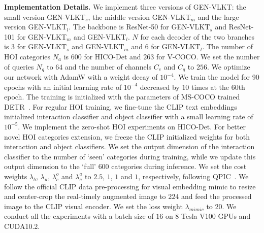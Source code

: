 \documentclass[10pt,twocolumn,letterpaper]{article}
\begin{document}
\noindent\textbf{Implementation Details.} We implement three versions of GEN-VLKT: the small version GEN-VLKT$_s$, the middle version GEN-VLKT$_m$ and the large version GEN-VLKT$_l$. The backbone is ResNet-50 for GEN-VLKT$_s$ and ResNet-101 for GEN-VLKT$_m$ and GEN-VLKT$_l$. $N$ for each decoder of the two branches is $3$ for GEN-VLKT$_s$ and GEN-VLKT$_m$ and $6$ for GEN-VLKT$_l$. The number of HOI categories $N_a$ is $600$ for HICO-Det and $263$ for V-COCO. We set the number of queries $N_q$ to $64$ and the number of channels $C_e$ and $C_q$ to $256$. We optimize our network with AdamW with a weight decay of $10^{-4}$. We train the model for 90 epochs with an initial learning rate of $10^{-4}$ decreased by $10$ times at the $60$th epoch. The training is initialized with the parameters of MS-COCO trained DETR~\cite{carion2020endtoend}. For regular HOI training, we fine-tune the CLIP text embeddings initialized interaction classifier and object classifier with a small learning rate of $10^{-5}$. We implement the zero-shot HOI experiments on HICO-Det. For better novel HOI categories extension, we freeze the CLIP initialized weights for both interaction and object classifiers. We set the output dimension of the interaction classifier to the number of `seen' categories during training, while we update this output dimension to the `full' $600$ categories during inference. We set the cost weights $\lambda_b$, $\lambda_u$, $\lambda_c^o$ and $\lambda_c^a$ to $2.5$, $1$, $1$ and $1$, respectively, following QPIC~\cite{tamura2021qpic}. We follow the official CLIP data pre-processing for visual embedding mimic to resize and center-crop the real-timely augmented image to $224$ and feed the processed image to the CLIP visual encoder. We set the loss weight $\lambda_{mimic}$ to $20$. We conduct all the experiments with a batch size of $16$ on $8$ Tesla V100 GPUs and CUDA10.2.
\end{document}
